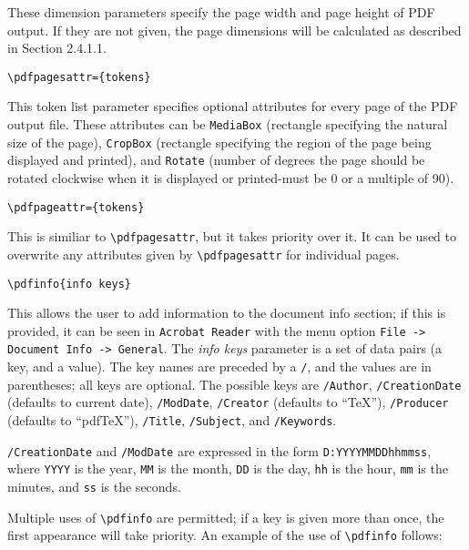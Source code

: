 These dimension parameters specify the page width and page height of PDF output. 
If they are not given, the page dimensions will be calculated as described in Section 
2.4.1.1. 

\begin{verbatim}
\pdfpagesattr={tokens} 
\end{verbatim}

This token list parameter specifies optional attributes for every page of the PDF 
output file. These attributes can be \verb|MediaBox| (rectangle specifying the natural size 
of the page), \verb|CropBox| (rectangle specifying the region of the page being displayed 
and printed), and \verb|Rotate| (number of degrees the page should be rotated clockwise 
when it is displayed or printed-must be 0 or a multiple of 90). 

\begin{verbatim}
\pdfpageattr={tokens}
\end{verbatim}

This is similiar to \verb|\pdfpagesattr|, but it takes priority over it. It can be used to 
overwrite any attributes given by \verb|\pdfpagesattr| for individual pages. 


\begin{verbatim}
\pdfinfo{info keys} 
\end{verbatim}

This allows the user to add information to the document info section; if this is 
provided, it can be seen in \verb|Acrobat Reader| with the menu option
\verb|File -> Document Info -> General|. The \emph{info keys} parameter is a set of data pairs (a key, and a value). 
The key names are preceded by a \verb|/|, and the values are in parentheses; all keys 
are optional. The possible keys are \verb|/Author|, \verb|/CreationDate| (defaults to current 
date), \verb|/ModDate|, \verb|/Creator| (defaults to ``TeX''),
\verb|/Producer| (defaults to ``pdfTeX''), 
\verb|/Title|, \verb|/Subject|, and \verb|/Keywords|. 

\verb|/CreationDate| and \verb|/ModDate| are expressed in the form
\verb|D:YYYYMMDDhhmmss|, 
where \verb|YYYY| is the year, \verb|MM| is the month, \verb|DD| is the day, \verb|hh| is the hour, \verb|mm| is 
the minutes, and \verb|ss| is the seconds. 

Multiple uses of \verb|\pdfinfo| are permitted; if a key is given more than once, the 
first appearance will take priority. An example of the use of \verb|\pdfinfo| follows: 

